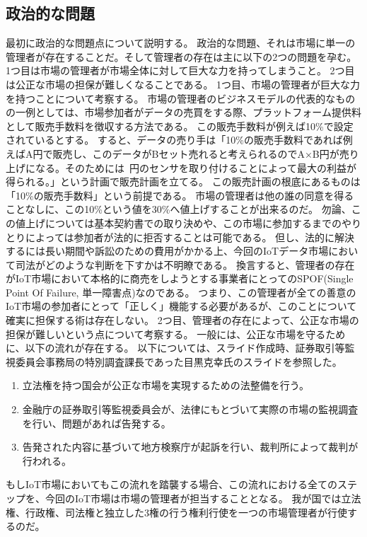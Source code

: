 \subsection{政治的な問題}
最初に政治的な問題点について説明する。
政治的な問題、それは市場に単一の管理者が存在することだ。そして管理者の存在は主に以下の2つの問題を孕む。
1つ目は市場の管理者が市場全体に対して巨大な力を持ってしまうこと。
2つ目は公正な市場の担保が難しくなることである。
1つ目、市場の管理者が巨大な力を持つことについて考察する。
市場の管理者のビジネスモデルの代表的なものの一例としては、市場参加者がデータの売買をする際、プラットフォーム提供料として販売手数料を徴収する方法である。
この販売手数料が例えば10\%で設定されているとする。
すると、データの売り手は「10\%の販売手数料であれば例えばA円で販売し、このデータがBセット売れると考えられるのでA×B円が売り上げになる。そのためには~円のセンサを取り付けることによって最大の利益が得られる。」という計画で販売計画を立てる。
この販売計画の根底にあるものは「10\%の販売手数料」という前提である。
市場の管理者は他の誰の同意を得ることなしに、この10\%という値を30\%へ値上げすることが出来るのだ。
勿論、この値上げについては基本契約書での取り決めや、この市場に参加するまでのやりとりによっては参加者が法的に拒否することは可能である。
但し、法的に解決するには長い期間や訴訟のための費用がかかる上、今回のIoTデータ市場において司法がどのような判断を下すかは不明瞭である。
換言すると、管理者の存在がIoT市場において本格的に商売をしようとする事業者にとってのSPOF(Single Point Of Failure, 単一障害点)なのである。
つまり、この管理者が全ての善意のIoT市場の参加者にとって「正しく」機能する必要があるが、このことについて確実に担保する術は存在しない。
2つ目、管理者の存在によって、公正な市場の担保が難しいという点について考察する。
一般には、公正な市場を守るために、以下の流れが存在する。
以下については、スライド作成時、証券取引等監視委員会事務局の特別調査課長であった目黒克幸氏のスライド\cite{kousei_torihiki}を参照した。
\begin{enumerate}
\item 立法権を持つ国会が公正な市場を実現するための法整備を行う。
\item 金融庁の証券取引等監視委員会が、法律にもとづいて実際の市場の監視調査を行い、問題があれば告発する。
\item 告発された内容に基づいて地方検察庁が起訴を行い、裁判所によって裁判が行われる。
\end{enumerate}
もしIoT市場においてもこの流れを踏襲する場合、この流れにおける全てのステップを、今回のIoT市場は市場の管理者が担当することとなる。
我が国では立法権、行政権、司法権と独立した3権の行う権利行使を一つの市場管理者が行使するのだ。
